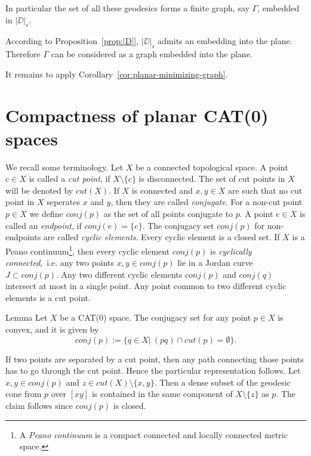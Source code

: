 \documentclass[a4paper,10pt]{amsart}
\begin{document}
In particular the set of all these geodesics forms a finite graph, say $\Gamma$,
embedded in $|\DD|_s$. 

According to Proposition~\ref{prop:|D|},
$|\DD|_s$ admits an embedding into the plane.
Therefore $\Gamma$ can be considered as a graph embedded into the plane.

It remains to apply Corollary~\ref{cor:planar-minimizing-graph}.
\qeds

\section{Compactness of planar CAT(0) spaces}

We recall some terminology. Let $X$ be a connected topological space. A point $c\in X$
is called a {\em cut point}, if $X\setminus \{c\}$ is disconnected. The set of cut points in $X$ 
will be denoted by $cut(X)$. If $X$ is connected and $x,y\in X$ are such that no cut point in $X$
seperates $x$ and $y$, then they are called {\em conjugate}. For a non-cut point $p\in X$
we define $conj(p)$ as the set of all points conjugate to $p$. A point $e\in X$ is called an {\em endpoint},
if $conj(e)=\{e\}$. The conjugacy set $conj(p)$ for non-endpoints
are called {\em cyclic elements}. Every cyclic element is a closed set\cite[IV(1.4)]{W2}. If $X$ is a 
Peano continuum\footnote{A {\em Peano continuum} is a compact
connected and locally connected metric space.}, then every cyclic element $conj(p)$ is {\em cyclically connected},\ i.e.
any two points $x,y\in conj(p)$ lie in a Jordan curve $J\subset conj(p)$\cite[III(3.32)]{Wi}. Any two different 
cyclic elements $conj(p)$ and $conj(q)$ intersect at most in a single point. Any point common to two 
different cyclic elements is a cut point\cite[IV(1.4)]{W2}.

\begin{thm}{Lemma}
 Let $X$ be a CAT(0) space. The conjugacy set for any point $p\in X$ is convex, and it is given by
 $$
conj(p):=\{q\in X|\ (pq)\cap cut(p)=\emptyset \}.
$$
\end{thm}

If two points are separated by a cut point, then any path connecting those points has to go through the cut point.
Hence the particular representation follows. Let $x,y\in conj(p)$ and $z\in cut(X)\setminus\{x,y\}$. Then a dense subset
of the geodesic cone from $p$ over $[xy]$ is contained in the same component of $X\setminus \{z\}$ as $p$. 
The claim follows since $conj(p)$ is closed.
\qeds
\end{document}
